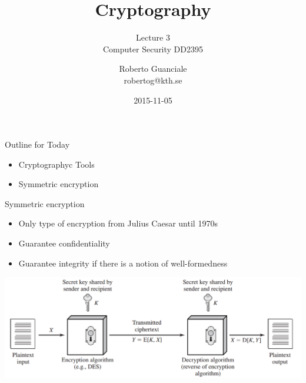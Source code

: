 \documentclass{beamer}
\title{Cryptography}
\subtitle{Lecture 3 \\ Computer Security DD2395}
\author[R. Guanciale]{
  Roberto Guanciale\\
  robertog@kth.se
}
\date{2015-11-05}
\begin{document}
\begin{frame}[plain]
  \titlepage
\end{frame}

\begin{frame}{Outline for Today}
  \begin{itemize}
    \item Cryptographyc Tools
    \item Symmetric encryption
  \end{itemize}
\end{frame}

\begin{frame}{Symmetric encryption}
  \begin{itemize}
  \item Only type of encryption from Julius Caesar until 1970s
  \item Guarantee confidentiality
  \item Guarantee integrity if there is a notion of well-formedness
  \end{itemize}
  \begin{center}
    \includegraphics[width=0.9\linewidth]{symm}
  \end{center}
\end{frame}
\end{document}
